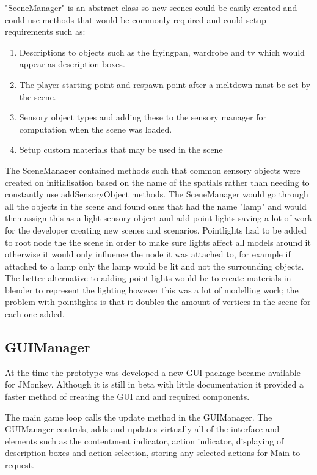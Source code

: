 \documentclass[11pt]{report}
\begin{document}
"SceneManager" is an abstract class so new scenes could be easily created and could use methods that would be commonly required and could setup requirements such as:

\begin{enumerate}
\item Descriptions to objects such as the fryingpan, wardrobe and tv which would appear as description boxes. 
\item The player starting point and respawn point after a meltdown must be set by the scene. 
\item Sensory object types and adding these to the sensory manager for computation when the scene was loaded. 
\item Setup custom materials that may be used in the scene
\end{enumerate}

The SceneManager contained methods such that common sensory objects were created on initialisation based on the name of the spatials rather than needing to constantly use addSensoryObject methods. The SceneManager would go through all the objects in the scene and found ones that had the name "lamp" and would then assign this as a light sensory object and add point lights saving a lot of work for the developer creating new scenes and scenarios. Pointlights had to be added to root node the the scene in order to make sure lights affect all models around it otherwise it would only influence the node it was attached to, for example if attached to a lamp only the lamp would be lit and not the surrounding objects. The better alternative to adding point lights would be to create materials in blender to represent the lighting however this was a lot of modelling work; the problem with pointlights is that it doubles the amount of vertices in the scene for each one added.

\subsection{GUIManager}
At the time the prototype was developed a new GUI package became available for JMonkey. Although it is still in beta with little documentation it provided a faster method of creating the GUI and and required components. 

The main game loop calls the update method in the GUIManager. The GUIManager controls, adds and updates virtually all of the interface and elements such as the contentment indicator, action indicator, displaying of description boxes and action selection, storing any selected actions for Main to request. 
\end{document}
